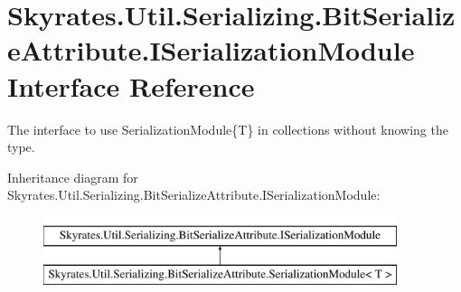 \hypertarget{interface_skyrates_1_1_util_1_1_serializing_1_1_bit_serialize_attribute_1_1_i_serialization_module}{\section{Skyrates.\-Util.\-Serializing.\-Bit\-Serialize\-Attribute.\-I\-Serialization\-Module Interface Reference}
\label{interface_skyrates_1_1_util_1_1_serializing_1_1_bit_serialize_attribute_1_1_i_serialization_module}
}


The interface to use Serialization\-Module\{\-T\} in collections without knowing the type.  


Inheritance diagram for Skyrates.\-Util.\-Serializing.\-Bit\-Serialize\-Attribute.\-I\-Serialization\-Module\-:\begin{figure}[H]
\begin{center}
\leavevmode
\includegraphics[height=2.000000cm]{interface_skyrates_1_1_util_1_1_serializing_1_1_bit_serialize_attribute_1_1_i_serialization_module}
\end{center}
\end{figure}
